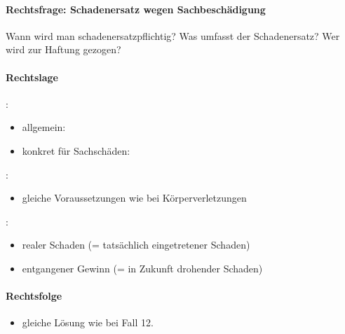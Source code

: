 \paragraph*{Rechtsfrage: Schadenersatz wegen Sachbeschädigung}

Wann wird man schadenersatzpflichtig? Was umfasst der Schadenersatz? Wer
wird zur Haftung gezogen?

\paragraph*{Rechtslage}

:

\begin{itemize}
	\item {\mdseries
	allgemein: }

	\item {\mdseries
	konkret f\"ur Sachschäden: }

\end{itemize}

:

\begin{itemize}
	\item[] {\mdseries
	gleiche Voraussetzungen wie bei K\"orperverletzungen}

\end{itemize}

:

\begin{itemize}
	\item {\mdseries
	realer Schaden (= tatsächlich eingetretener Schaden)}

	\item {\mdseries
	entgangener Gewinn (= in Zukunft drohender Schaden)}

\end{itemize}

\paragraph*{Rechtsfolge}

\begin{itemize}
	\item {\mdseries\color[rgb]{0.0,0.0,0.5019608}
	gleiche L\"osung wie bei Fall 12.}

\end{itemize}

